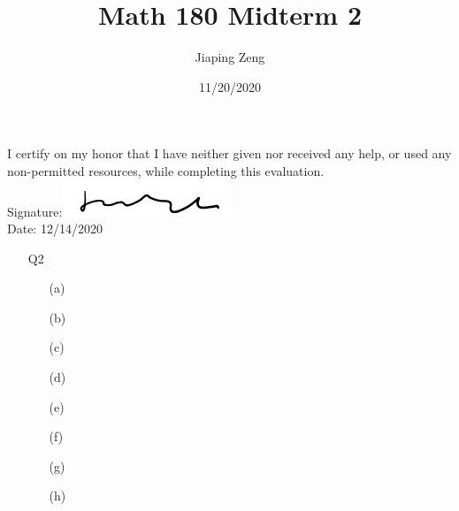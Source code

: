 \documentclass{article}
\title{Math 180 Midterm 2}
\author{Jiaping Zeng}
\date{11/20/2020}
\begin{document}

\newpage
I certify on my honor that I have neither given nor received any help, or used any non-permitted resources, while completing this evaluation.\\
Signature:\includegraphics[width=2in]{signature.png}\\
Date: 12/14/2020

\newpage
\begin{itemize}
      \item [Q2]
            \begin{itemize}
                  \item [(a)]
                  \item [(b)]
                  \item [(c)]
                  \item [(d)]
                  \item [(e)]
                  \item [(f)]
                  \item [(g)]
                  \item [(h)]
            \end{itemize}
\end{itemize}
\end{document}
